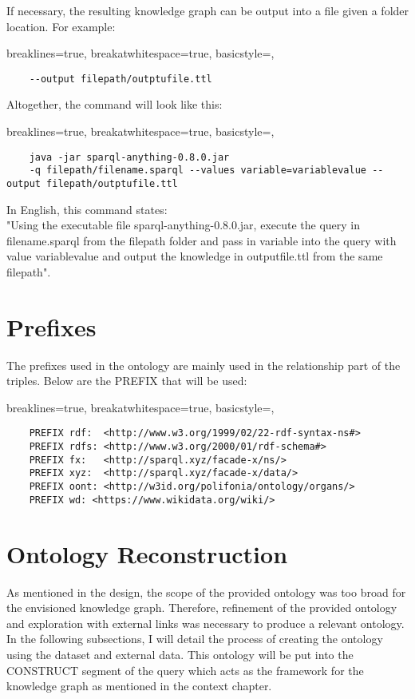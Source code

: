 \noindent If necessary, the resulting knowledge graph can be output into a file given a folder location. For example:

\lstset
{
    breaklines=true,
    breakatwhitespace=true,
    basicstyle=\ttfamily,
}
\begin{lstlisting}
    --output filepath/outptufile.ttl
\end{lstlisting}

\noindent Altogether, the command will look like this:

\lstset
{
    breaklines=true,
    breakatwhitespace=true,
    basicstyle=\ttfamily,
}
\begin{lstlisting}
    java -jar sparql-anything-0.8.0.jar
    -q filepath/filename.sparql --values variable=variablevalue --output filepath/outptufile.ttl
\end{lstlisting}

\noindent In English, this command states: \\
\hspace*{0.5cm} "Using the executable file sparql-anything-0.8.0.jar, execute the query in filename.sparql from the filepath folder and pass in variable into the query with value variablevalue and output the knowledge in outputfile.ttl from the same filepath". 

\section{Prefixes}
\hspace*{0.5cm} The prefixes used in the ontology are mainly used in the relationship part of the triples. Below are the PREFIX that will be used:

\lstset
{
    breaklines=true,
    breakatwhitespace=true,
    basicstyle=\ttfamily,
}
\begin{lstlisting}
    PREFIX rdf:  <http://www.w3.org/1999/02/22-rdf-syntax-ns#>
    PREFIX rdfs: <http://www.w3.org/2000/01/rdf-schema#>
    PREFIX fx:   <http://sparql.xyz/facade-x/ns/>
    PREFIX xyz:  <http://sparql.xyz/facade-x/data/>
    PREFIX oont: <http://w3id.org/polifonia/ontology/organs/>
    PREFIX wd: <https://www.wikidata.org/wiki/> 
\end{lstlisting}

\section{Ontology Reconstruction}
\hspace*{0.5cm} As mentioned in the design, the scope of the provided ontology was too broad for the envisioned knowledge graph. Therefore, refinement of the provided ontology and exploration with external links was necessary to produce a relevant ontology. In the following subsections, I will detail the process of creating the ontology using the dataset and external data. This ontology will be put into the CONSTRUCT segment of the query which acts as the framework for the knowledge graph as mentioned in the context chapter. 

